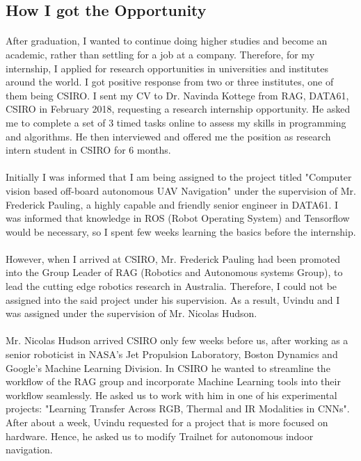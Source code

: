 
\subsection{How I got the Opportunity}

\paragraph{}
After graduation, I wanted to continue doing higher studies and become an academic, rather than settling for a job at a company. Therefore, for my internship, I applied for research opportunities in universities and institutes around the world. I got positive response from two or three institutes, one of them being CSIRO. I sent my CV to Dr. Navinda Kottege from RAG, DATA61, CSIRO in February 2018, requesting a research internship opportunity. He asked me to complete a set of 3 timed tasks online to assess my skills in programming and algorithms. He then interviewed and offered me the position as research intern student in CSIRO for 6 months.

\paragraph{}
Initially I was informed that I am being assigned to the project titled "Computer vision based off-board autonomous UAV Navigation" under the supervision of Mr. Frederick Pauling, a highly capable and friendly senior engineer in DATA61. I was informed that knowledge in ROS (Robot Operating System) and Tensorflow would be necessary, so I spent few weeks learning the basics before the internship.

\paragraph{}
However, when I arrived at CSIRO, Mr. Frederick Pauling had been promoted into the Group Leader of RAG (Robotics and Autonomous systems Group), to lead the cutting edge robotics research in Australia. Therefore, I could not be assigned into the said project under his supervision. As a result, Uvindu and I was assigned under the supervision of Mr. Nicolas Hudson.

\paragraph{}
Mr. Nicolas Hudson arrived CSIRO only few weeks before us, after working as a senior roboticist in NASA's Jet Propulsion Laboratory, Boston Dynamics and Google's Machine Learning Division. In CSIRO he wanted to streamline the workflow of the RAG group and incorporate Machine Learning tools into their workflow seamlessly. He asked us to work with him in one of his experimental projects: "Learning Transfer Across RGB, Thermal and IR Modalities in CNNs". After about a week, Uvindu requested for a project that is more focused on hardware. Hence, he asked us to modify Trailnet for autonomous indoor navigation.

